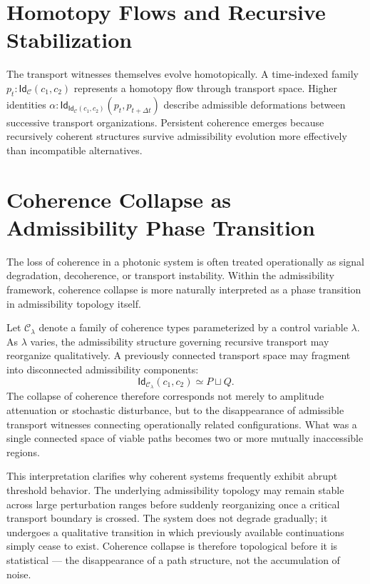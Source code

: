 \documentclass[11pt,openany]{book}
\theoremstyle{definition}
\theoremstyle{plain}
\newcommand{\idtype}{\mathsf{Id}}
\begin{document}
\section{Homotopy Flows and Recursive Stabilization}

The transport witnesses themselves evolve homotopically. A time-indexed family $p_t : \idtype_{\mathcal{C}}(c_1,c_2)$ represents a homotopy flow through transport space. Higher identities $\alpha : \idtype_{\idtype_{\mathcal{C}}(c_1,c_2)}(p_t, p_{t+\Delta t})$ describe admissible deformations between successive transport organizations. Persistent coherence emerges because recursively coherent structures survive admissibility evolution more effectively than incompatible alternatives.

\section{Coherence Collapse as Admissibility Phase Transition}

The loss of coherence in a photonic system is often treated operationally as signal degradation, decoherence, or transport instability. Within the admissibility framework, coherence collapse is more naturally interpreted as a phase transition in admissibility topology itself.

Let $\mathcal{C}_\lambda$ denote a family of coherence types parameterized by a control variable $\lambda$. As $\lambda$ varies, the admissibility structure governing recursive transport may reorganize qualitatively. A previously connected transport space may fragment into disconnected admissibility components:
\[
\idtype_{\mathcal{C}_\lambda}(c_1,c_2) \simeq P \sqcup Q.
\]
The collapse of coherence therefore corresponds not merely to amplitude attenuation or stochastic disturbance, but to the disappearance of admissible transport witnesses connecting operationally related configurations. What was a single connected space of viable paths becomes two or more mutually inaccessible regions.

This interpretation clarifies why coherent systems frequently exhibit abrupt threshold behavior. The underlying admissibility topology may remain stable across large perturbation ranges before suddenly reorganizing once a critical transport boundary is crossed. The system does not degrade gradually; it undergoes a qualitative transition in which previously available continuations simply cease to exist. Coherence collapse is therefore topological before it is statistical --- the disappearance of a path structure, not the accumulation of noise.
\end{document}
